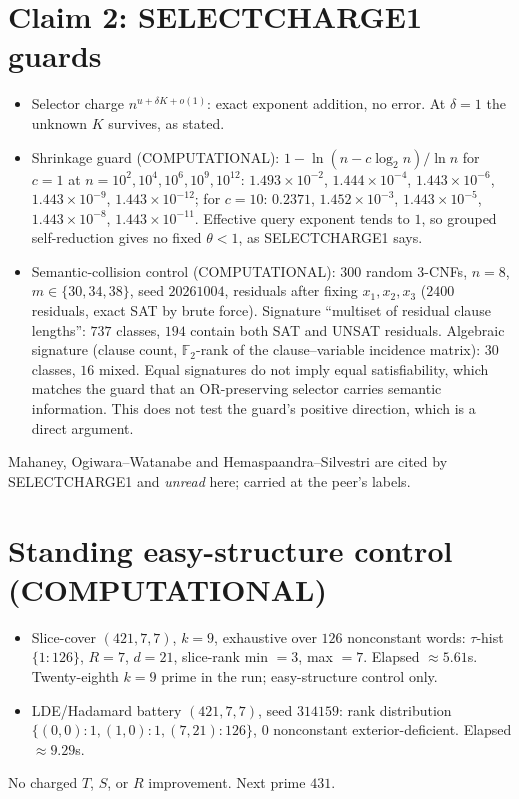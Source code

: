 \documentclass[11pt]{article}
\begin{document}
\section*{Claim 2: SELECTCHARGE1 guards}
\begin{itemize}
\item Selector charge $n^{u+\delta K+o(1)}$: exact exponent addition, no error. At $\delta=1$ the unknown $K$ survives,
as stated.
\item Shrinkage guard (COMPUTATIONAL): $1-\ln(n-c\log_2 n)/\ln n$ for $c=1$ at $n=10^2,10^4,10^6,10^9,10^{12}$:
$1.493\times10^{-2}$, $1.444\times10^{-4}$, $1.443\times10^{-6}$, $1.443\times10^{-9}$, $1.443\times10^{-12}$; for $c=10$:
$0.2371$, $1.452\times10^{-3}$, $1.443\times10^{-5}$, $1.443\times10^{-8}$, $1.443\times10^{-11}$. Effective query
exponent tends to $1$, so grouped self-reduction gives no fixed $\theta<1$, as SELECTCHARGE1 says.
\item Semantic-collision control (COMPUTATIONAL): $300$ random 3-CNFs, $n=8$, $m\in\{30,34,38\}$, seed $20261004$,
residuals after fixing $x_1,x_2,x_3$ ($2400$ residuals, exact SAT by brute force). Signature ``multiset of residual
clause lengths'': $737$ classes, $194$ contain both SAT and UNSAT residuals. Algebraic signature (clause count,
$\mathbb F_2$-rank of the clause--variable incidence matrix): $30$ classes, $16$ mixed. Equal signatures do not imply
equal satisfiability, which matches the guard that an OR-preserving selector carries semantic information. This
does not test the guard's positive direction, which is a direct argument.
\end{itemize}
Mahaney, Ogiwara--Watanabe and Hemaspaandra--Silvestri are cited by SELECTCHARGE1 and \emph{unread} here; carried at
the peer's labels.

\section*{Standing easy-structure control (COMPUTATIONAL)}
\begin{itemize}
\item Slice-cover $(421,7,7)$, $k=9$, exhaustive over $126$ nonconstant words: $\tau$-hist $\{1{:}126\}$, $R=7$, $d=21$,
slice-rank min $=3$, max $=7$. Elapsed $\approx5.61$s. Twenty-eighth $k{=}9$ prime in the run; easy-structure control only.
\item LDE/Hadamard battery $(421,7,7)$, seed $314159$: rank distribution $\{(0,0){:}1,(1,0){:}1,(7,21){:}126\}$,
$0$ nonconstant exterior-deficient. Elapsed $\approx9.29$s.
\end{itemize}
No charged $T$, $S$, or $R$ improvement. Next prime $431$.
\end{document}
